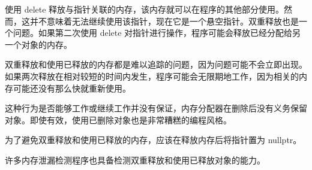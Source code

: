 
使用 delete 释放与指针关联的内存，该内存就可以在程序的其他部分使用。然而，这并不意味着无法继续使用该指针，现在它是一个悬空指针。双重释放也是一个问题。如果第二次使用 delete 对指针进行操作，程序可能会释放已经分配给另一个对象的内存。

双重释放和使用已释放的内存都是难以追踪的问题，因为问题可能不会立即出现。如果两次释放在相对较短的时间内发生，程序可能会无限期地工作，因为相关的内存可能还没有那么快就重新使用。

这种行为是否能够工作或继续工作并没有保证，内存分配器在删除后没有义务保留对象。即使有效，使用已删除对象也是非常糟糕的编程风格。

为了避免双重释放和使用已释放的内存，应该在释放内存后将指针置为 nullptr。

许多内存泄漏检测程序也具备检测双重释放和使用已释放对象的能力。












